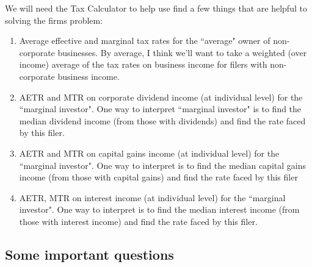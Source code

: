 \documentclass[letterpaper,12pt]{article}
\theoremstyle{definition}
\begin{document}
\begin{spacing}{1.5}
We will need the Tax Calculator to help use find a few things that are helpful to solving the firms problem:
\begin{enumerate}
\item Average effective and marginal tax rates for the ``average" owner of non-corporate businesses.  By average, I think we'll want to take a weighted (over income) average of the tax rates on business income for filers with non-corporate business income.
\item AETR and MTR on corporate dividend income (at individual level) for the ``marginal investor". One way to interpret ``marginal investor" is to find the median dividend income (from those with dividends) and find the rate faced by this filer. 
\item AETR and MTR on capital gains income (at individual level) for the ``marginal investor".  One way to interpret is to find the median capital gains income (from those with capital gains) and find the rate faced by this filer 
\item AETR, MTR on interest income (at individual level) for the ``marginal investor". One way to interpret is to find the median interest income (from those with interest income) and find the rate faced by this filer. 
\end{enumerate}


\subsection{Some important questions}


\end{spacing}
\end{document}
